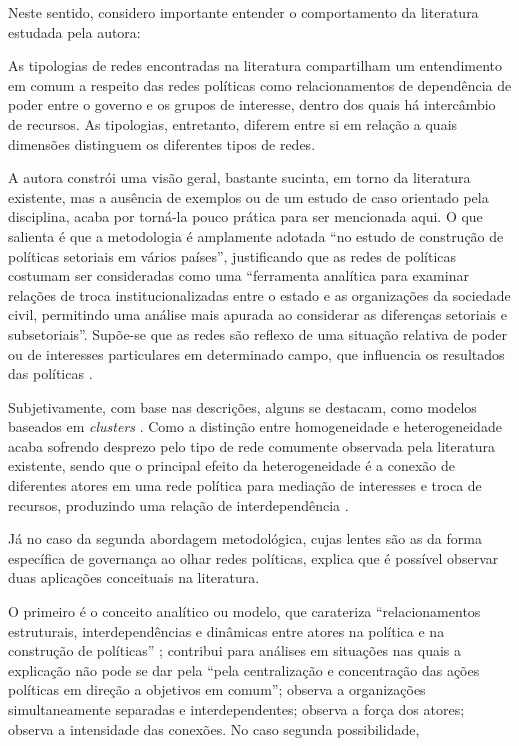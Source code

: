 \documentclass[
article,			%
11pt,				%
oneside,			%
a4paper,			%
english,			%
brazil,				%
sumario=tradicional
]{abntex2}
\begin{document}
	Neste sentido, considero importante entender o comportamento da literatura estudada pela autora:
	
	\begin{citacao}
		As tipologias de redes encontradas na literatura compartilham um entendimento em comum a respeito das redes políticas como relacionamentos de dependência de poder entre o governo e os grupos de interesse, dentro dos quais há intercâmbio de recursos. As tipologias, entretanto, diferem entre si em relação a quais dimensões distinguem os diferentes tipos de redes. \cite[p. 225--226]{borzel2008a}
	\end{citacao}
	
	A autora constrói uma visão geral, bastante sucinta, em torno da literatura existente, mas a ausência de exemplos ou de um estudo de caso orientado pela disciplina, acaba por torná-la pouco prática para ser mencionada aqui. O que \cite[p. 229--230]{borzel2008a} salienta é que a metodologia é amplamente adotada ``no estudo de construção de políticas setoriais em vários países'', justificando que as redes de políticas costumam ser consideradas como uma ``ferramenta analítica para examinar relações de troca institucionalizadas entre o estado e as organizações da sociedade civil, permitindo uma análise mais apurada ao considerar as diferenças setoriais e subsetoriais''. Supõe-se que as redes são reflexo de uma situação relativa de poder ou de interesses particulares em determinado campo, que influencia os resultados das políticas \cite[p. 230]{borzel2008a}.
	
	Subjetivamente, com base nas descrições, alguns se destacam, como modelos baseados em \textit{clusters} \cite[p. 227]{borzel2008a}. Como a distinção entre homogeneidade e heterogeneidade acaba sofrendo desprezo pelo tipo de rede comumente observada pela literatura existente, sendo que o principal efeito da heterogeneidade é a conexão de diferentes atores em uma rede política para mediação de interesses e troca de recursos, produzindo uma relação de interdependência \cite[p. 229]{borzel2008a}.
	
	Já no caso da segunda abordagem metodológica, cujas lentes são as da forma específica de governança ao olhar redes políticas,  explica que é possível observar duas aplicações conceituais na literatura.
	
	O primeiro é o conceito analítico ou modelo, que carateriza ``relacionamentos estruturais, interdependências e dinâmicas entre atores na política e na construção de políticas'' ; contribui para análises em situações nas quais a explicação não pode se dar pela ``pela centralização e concentração das ações políticas em direção a objetivos em comum''; observa a organizações simultaneamente separadas e interdependentes; observa a força dos atores; observa a intensidade das conexões. No caso segunda possibilidade,
	
\end{document}
